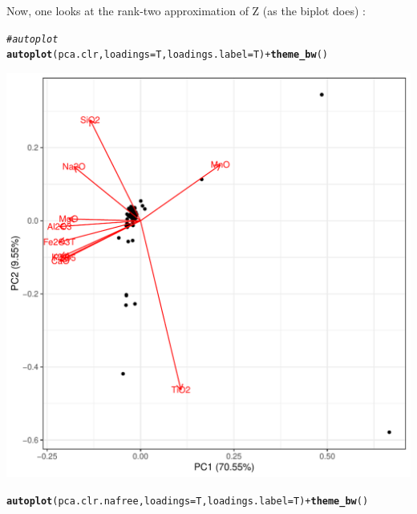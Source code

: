 \documentclass[a4paper,oneside,12pt,titlepage]{article}\usepackage[]{graphicx}\usepackage[]{color}
\makeatletter
\def\maxwidth{ %
  \ifdim\Gin@nat@width>\linewidth
    \linewidth
  \else
    \Gin@nat@width
  \fi
}
\newcommand{\hlcom}[1]{\textcolor[rgb]{0.678,0.584,0.686}{\textit{#1}}}%
\newcommand{\hlopt}[1]{\textcolor[rgb]{0,0,0}{#1}}%
\newcommand{\hlstd}[1]{\textcolor[rgb]{0.345,0.345,0.345}{#1}}%
\newcommand{\hlkwc}[1]{\textcolor[rgb]{0.333,0.667,0.333}{#1}}%
\newcommand{\hlkwd}[1]{\textcolor[rgb]{0.737,0.353,0.396}{\textbf{#1}}}%
\newenvironment{kframe}{%
 \def\at@end@of@kframe{}%
 \ifinner\ifhmode%
  \def\at@end@of@kframe{\end{minipage}}%
  \begin{minipage}{\columnwidth}%
 \fi\fi%
 \def\FrameCommand##1{\hskip\@totalleftmargin \hskip-\fboxsep
 \colorbox{shadecolor}{##1}\hskip-\fboxsep
     \hskip-\linewidth \hskip-\@totalleftmargin \hskip\columnwidth}%
 \MakeFramed {\advance\hsize-\width
   \@totalleftmargin\z@ \linewidth\hsize
   \@setminipage}}%
 {\par\unskip\endMakeFramed%
 \at@end@of@kframe}
\newenvironment{knitrout}{}{} %
\makeatother
\begin{document}
Now, one looks at the rank-two approximation of Z (as the biplot does) :
\begin{knitrout}
\color{fgcolor}\begin{kframe}
\begin{alltt}
\hlcom{# autoplot}
\hlkwd{autoplot}\hlstd{(pca.clr,}\hlkwc{loadings}\hlstd{=T,}\hlkwc{loadings.label}\hlstd{=T)}\hlopt{+}\hlkwd{theme_bw}\hlstd{()}
\end{alltt}
\end{kframe}
\includegraphics[width=\maxwidth]{figure/unnamed-chunk-10-1} 
\begin{kframe}\begin{alltt}
\hlkwd{autoplot}\hlstd{(pca.clr.nafree,}\hlkwc{loadings}\hlstd{=T,}\hlkwc{loadings.label}\hlstd{=T)}\hlopt{+}\hlkwd{theme_bw}\hlstd{()}
\end{alltt}
\end{kframe}

\end{knitrout}
\end{document}
